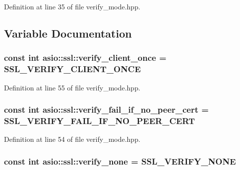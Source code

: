 Definition at line 35 of file verify\+\_\+mode.\+hpp.



\subsection{Variable Documentation}
\hypertarget{namespaceasio_1_1ssl_af9dfada7a85d6a5bfb257eb5ad280ce7}{}
\subsubsection[{verify\+\_\+client\+\_\+once}]{\setlength{\rightskip}{0pt plus 5cm}const int asio\+::ssl\+::verify\+\_\+client\+\_\+once = S\+S\+L\+\_\+\+V\+E\+R\+I\+F\+Y\+\_\+\+C\+L\+I\+E\+N\+T\+\_\+\+O\+N\+C\+E}\label{namespaceasio_1_1ssl_af9dfada7a85d6a5bfb257eb5ad280ce7}


Definition at line 55 of file verify\+\_\+mode.\+hpp.

\hypertarget{namespaceasio_1_1ssl_a7f69308747090e59be95a6c9b2497eb5}{}
\subsubsection[{verify\+\_\+fail\+\_\+if\+\_\+no\+\_\+peer\+\_\+cert}]{\setlength{\rightskip}{0pt plus 5cm}const int asio\+::ssl\+::verify\+\_\+fail\+\_\+if\+\_\+no\+\_\+peer\+\_\+cert = S\+S\+L\+\_\+\+V\+E\+R\+I\+F\+Y\+\_\+\+F\+A\+I\+L\+\_\+\+I\+F\+\_\+\+N\+O\+\_\+\+P\+E\+E\+R\+\_\+\+C\+E\+R\+T}\label{namespaceasio_1_1ssl_a7f69308747090e59be95a6c9b2497eb5}


Definition at line 54 of file verify\+\_\+mode.\+hpp.

\hypertarget{namespaceasio_1_1ssl_a4b2056fdb330248b703c81a5458053cd}{}
\subsubsection[{verify\+\_\+none}]{\setlength{\rightskip}{0pt plus 5cm}const int asio\+::ssl\+::verify\+\_\+none = S\+S\+L\+\_\+\+V\+E\+R\+I\+F\+Y\+\_\+\+N\+O\+N\+E}\label{namespaceasio_1_1ssl_a4b2056fdb330248b703c81a5458053cd}


